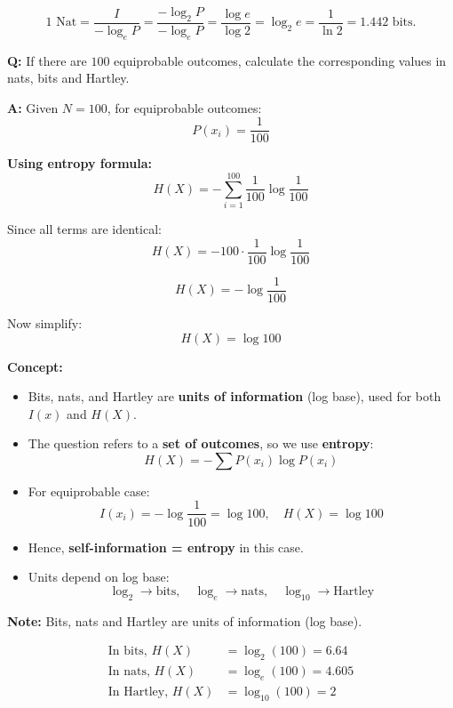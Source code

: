 \documentclass[11pt,a4paper]{book}
\newenvironment{formulabox}[1][Formula]{%
    \begin{tcolorbox}[
        enhanced,
        breakable,
        colback=softcoral!10,
        colframe=softcoral!200,
        title=#1,
        fonttitle=\bfseries,
        coltitle=white,
        sharp corners,
        boxrule=1pt,
        left=8pt,
        right=8pt,
        top=6pt,
        bottom=6pt
    ]
}{\end{tcolorbox}}
\newcounter{qna}[chapter]
\renewcommand{\theqna}{\thechapter.\arabic{qna}}
\newenvironment{questionanswerbox}[1][Example]{%
    \refstepcounter{qna}
    \begin{tcolorbox}[
        enhanced,
        breakable,
        colback=softlavender!10,
        colframe=softlavender!200,
        title={#1~\theqna},
        fonttitle=\bfseries,
        coltitle=white,
        colbacktitle=softlavender!200,
        sharp corners,
        boxrule=1pt,
        left=8pt,
        right=8pt,
        top=6pt,
        bottom=6pt
    ]
}{\end{tcolorbox}}
\begin{document}
\begin{formulabox}[Nats to Bits]
\[
1 \text{ Nat}
= \frac{I}{-\log_e P}
= \frac{-\log_2 P}{-\log_e P}
= \frac{\log e}{\log 2}
= \log_2 e
= \frac{1}{\ln 2}
= 1.442 \text{ bits.}
\]
\end{formulabox}

\begin{questionanswerbox}[Example]
\textbf{Q:} If there are $100$ equiprobable outcomes, calculate the corresponding values in nats, bits and Hartley.

\textbf{A:} Given $N = 100$, for equiprobable outcomes:
\[
P(x_i) = \frac{1}{100}
\]

\textbf{Using entropy formula:}
\[
H(X) = -\sum_{i=1}^{100} \frac{1}{100} \log \frac{1}{100}
\]

Since all terms are identical:
\[
H(X) = -100 \cdot \frac{1}{100} \log \frac{1}{100}
\]

\[
H(X) = -\log \frac{1}{100}
\]

Now simplify:
\[
H(X) = \log 100
\]

\textbf{Concept:}
\begin{itemize}
    \item Bits, nats, and Hartley are \textbf{units of information} (log base), used for both $I(x)$ and $H(X)$.
    \item The question refers to a \textbf{set of outcomes}, so we use \textbf{entropy}:
    \[
    H(X) = -\sum P(x_i)\log P(x_i)
    \]
    \item For equiprobable case:
    \[
    I(x_i) = -\log \frac{1}{100} = \log 100, \quad H(X) = \log 100
    \]
    \item Hence, \textbf{self-information = entropy} in this case.
    \item Units depend on log base:
    \[
    \log_2 \rightarrow \text{bits}, \quad
    \log_e \rightarrow \text{nats}, \quad
    \log_{10} \rightarrow \text{Hartley}
    \]
\end{itemize}

\textbf{Note:} Bits, nats and Hartley are units of information (log base).

\begin{align*}
\text{In bits, } H(X) &= \log_2(100) = 6.64 \\
\text{In nats, } H(X) &= \log_e(100) = 4.605 \\
\text{In Hartley, } H(X) &= \log_{10}(100) = 2
\end{align*}
\end{questionanswerbox}
\end{document}
